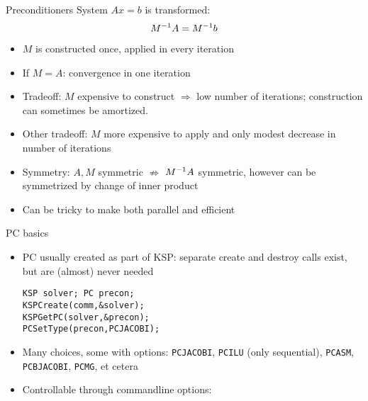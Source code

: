 \begin{numberedframe}{Preconditioners}
System $Ax=b$ is transformed:
\[ M^{-1} A=M^{-1} b \]
\begin{itemize}
\item $M$ is constructed once, applied in every iteration
\item If $M=A$: convergence in one iteration
\item Tradeoff: $M$ expensive to construct $\Rightarrow$ low number of
  iterations; construction can sometimes be amortized.
\item Other tradeoff: $M$ more expensive to apply and only modest
  decrease in number of iterations
\item Symmetry: $A,M$ symmetric $\not\Rightarrow$ $M^{-1} A$ symmetric,
  however can be symmetrized by change of inner product
\item Can be tricky to make both parallel and efficient
\end{itemize}
\end{numberedframe}

\begin{numberedframe}{PC basics}
  \begin{itemize}
  \item PC usually created as part of KSP: separate create and destroy
    calls exist, but are (almost) never needed
\begin{lstlisting}
KSP solver; PC precon;
KSPCreate(comm,&solver);
KSPGetPC(solver,&precon);
PCSetType(precon,PCJACOBI);
\end{lstlisting}
  \item Many choices, some with options: \lstinline{PCJACOBI}, \lstinline{PCILU} (only
    sequential), \lstinline{PCASM}, \lstinline{PCBJACOBI}, \lstinline{PCMG}, et cetera
  \item Controllable through commandline options:\\
  \end{itemize}
\end{numberedframe}

